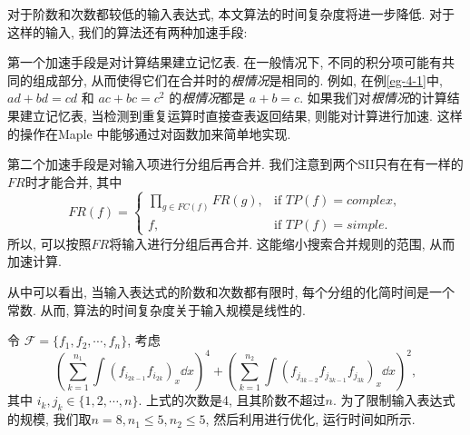 对于阶数和次数都较低的输入表达式, 本文算法的时间复杂度将进一步降低. 对于这样的输入, 我们的算法还有两种加速手段: 
\begin{asparaenum}[(I)]
\item 第一个加速手段是对计算结果建立记忆表. 在一般情况下, 不同的积分项可能有共同的组成部分, 从而使得它们在合并时的\emph{根情况}是相同的. 例如, 在例\ref{eg-4-1}中, $ad+bd=cd$ 和 $ac+bc=c^2$ 的\emph{根情况}都是 $a+b=c$. 如果我们对\emph{根情况}的计算结果建立记忆表, 当检测到重复运算时直接查表返回结果, 则能对计算进行加速. 这样的操作在Maple 中能够通过对函数加来简单地实现.
\item 第二个加速手段是对输入项进行分组后再合并. 我们注意到两个SII只有在有一样的$FR$时才能合并, 其中\begin{equation}    
FR(f)=\left\{
\begin{array}{cl}
\prod\limits_{g\in FC(f)}{FR(g)}, &\text{if }TP(f)=complex,\\ 
f,           &\text{if }TP(f)=simple.
\end{array}
\right.
\end{equation} 
所以, 可以按照$FR$将输入进行分组后再合并. 这能缩小搜索合并规则的范围, 从而加速计算. 
\end{asparaenum}

从中可以看出, 当输入表达式的阶数和次数都有限时, 每个分组的化简时间是一个常数. 从而, 算法的时间复杂度关于输入规模是线性的. 

令 $\mathcal F=\{f_1,f_2,\cdots,f_n\}$, 考虑
\begin{equation}
\left(\sum\limits_{k=1}^{n_1}{\int\!{(f_{i_{2k-1}}f_{i_{2k}})_x\dd x}}\right)^4+\left(\sum\limits_{k=1}^{n_2}{\int\!{(f_{j_{3k-2}}f_{j_{3k-1}}f_{j_{3k}})_x\dd x}}\right)^2,
\label{construct}
\end{equation}
其中 $i_k,j_k \in \{1,2,\cdots,n\}$. 上式的次数是4, 且其阶数不超过$n$. 为了限制输入表达式的规模, 我们取$n=8,n_1\le 5,n_2\le 5$, 然后利用进行优化, 运行时间如所示.  

